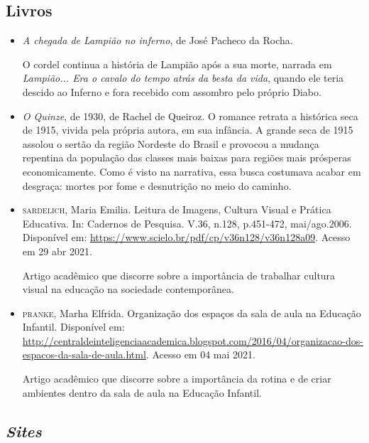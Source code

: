 \documentclass[11pt]{extarticle}
\begin{document}
\subsection{Livros}

\begin{itemize}
	\item \textit{A chegada de Lampião no inferno}, de José Pacheco da Rocha. 

O cordel continua a história de Lampião após a sua morte, narrada em \textit{Lampião... Era o cavalo do tempo atrás da besta da vida}, quando ele teria descido ao Inferno e fora recebido com assombro pelo próprio Diabo. 

	\item \textit{O Quinze}, de 1930, de Rachel de Queiroz. O romance retrata a histórica seca de 1915, vivida
pela própria autora, em sua infância. A grande seca de 1915 assolou o sertão da região Nordeste do Brasil
e provocou a mudança repentina da população das classes mais baixas para regiões mais prósperas economicamente.
Como é visto na narrativa, essa busca costumava acabar em desgraça: mortes por fome e desnutrição no meio do caminho.
\end{itemize}

\begin{itemize}
\item \textsc{sardelich}, Maria Emilia. Leitura de Imagens, Cultura Visual e Prática Educativa. 
In: Cadernos de Pesquisa. V.36, n.128, p.451-472, mai/ago.2006. Disponível em: \url{https://www.scielo.br/pdf/cp/v36n128/v36n128a09}. Acesso em 29 abr 2021. 

Artigo acadêmico que discorre sobre a importância de trabalhar cultura 
visual na educação na sociedade contemporânea. 

\item \textsc{pranke}, Marha Elfrida. Organização dos espaços da sala de aula na Educação Infantil. Disponível em: \url{http://centraldeinteligenciaacademica.blogspot.com/2016/04/organizacao-dos-espacos-da-sala-de-aula.html}. Acesso em 04 mai 2021. 

Artigo acadêmico que discorre sobre a importância da rotina e de criar ambientes dentro da sala de aula na Educação Infantil.  
\end{itemize}

\subsection{\textit{Sites}}
\end{document}
